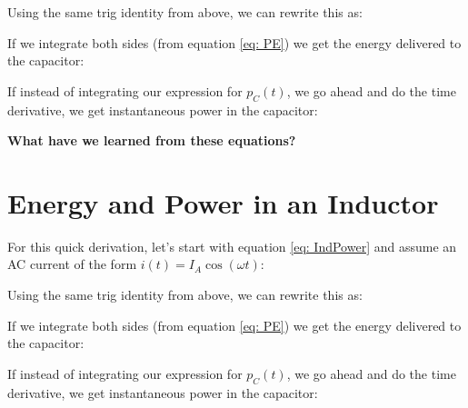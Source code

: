 \documentclass{handout}
\begin{document}
Using the same trig identity from above, we can rewrite this as:

If we integrate both sides (from equation \ref{eq: PE}) we get the energy delivered to the capacitor:
\soln{1in}{
\[
w_C(t) = \frac{1}{4}CV_A^2\left[1+\cos(2\omega t)\right]
\]
}

If instead of integrating our expression for $p_C(t)$, we go ahead and do the time derivative, we get instantaneous power in the capacitor:
\soln{1in}{
\[
p_C(t) = -\frac{\omega CV_A^2}{2}\sin(2\omega t)
\]
}

\textbf{What have we learned from these equations?}


\newpage
\clearpage
\pagebreak

\section{Energy and Power in an Inductor}
For this quick derivation, let's start with equation \ref{eq: IndPower} and assume an AC current of the form $i(t) = I_A\cos(\omega t)$:
\soln{1in}{
\[
p_L(t) = \frac{\partial }{\partial t}\left[ \frac{1}{2}LI_A^2\cos^2(\omega t) \right]
\]
}

Using the same trig identity from above, we can rewrite this as:

If we integrate both sides (from equation \ref{eq: PE}) we get the energy delivered to the capacitor:
\soln{1in}{
\[
w_L(t) = \frac{1}{4}LI_A^2\left[1+\cos(2\omega t)\right]
\]
}

If instead of integrating our expression for $p_C(t)$, we go ahead and do the time derivative, we get instantaneous power in the capacitor:
\soln{1in}{
\[
p_L(t) = -\frac{\omega LI_A^2}{2}\sin(2\omega t)
\]
}
\end{document}
